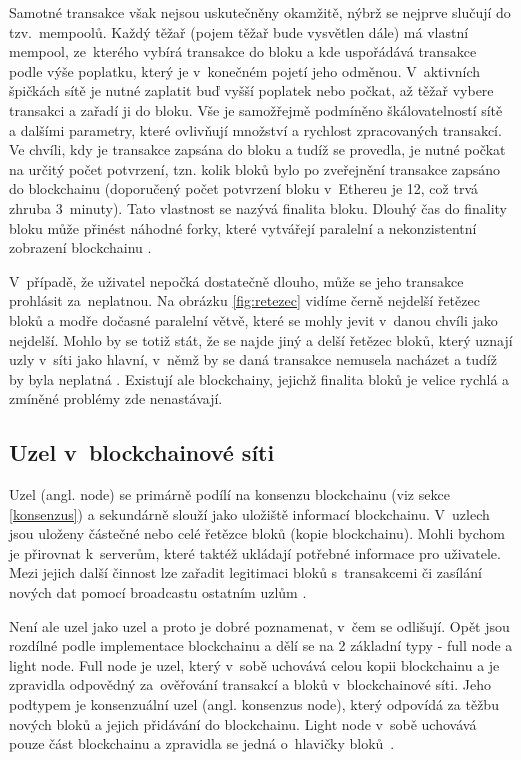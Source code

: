Samotné transakce však nejsou uskutečněny okamžitě, nýbrž se nejprve slučují do tzv.~mempoolů. Každý těžař (pojem těžař bude vysvětlen dále) má vlastní mempool, ze~kterého vybírá transakce do bloku a kde uspořádává transakce podle výše poplatku, který je v~konečném pojetí jeho odměnou. V~aktivních špičkách sítě je nutné zaplatit buď vyšší poplatek nebo počkat, až těžař vybere transakci a zařadí ji do bloku. Vše je samožřejmě podmíněno škálovatelností sítě a dalšími parametry, které ovlivňují množství a rychlost zpracovaných transakcí. Ve chvíli, kdy je transakce zapsána do bloku a tudíž se provedla, je nutné počkat na určitý počet potvrzení, tzn. kolik bloků bylo po zveřejnění transakce zapsáno do blockchainu (doporučený počet potvrzení bloku v~Ethereu je 12, což trvá zhruba 3~minuty). Tato vlastnost se nazývá finalita bloku. Dlouhý čas do finality bloku může přinést náhodné forky, které vytvářejí paralelní a nekonzistentní zobrazení blockchainu \cite{transaction}. 

V~případě, že uživatel nepočká dostatečně dlouho, může se jeho transakce prohlásit za~neplatnou. Na obrázku \ref{fig:retezec} vidíme černě nejdelší řetězec bloků a modře dočasné paralelní větvě, které se mohly jevit v~danou chvíli jako nejdelší. Mohlo by se totiž stát, že se najde jiný a delší řetězec bloků, který uznají uzly v~síti jako hlavní, v~němž by se daná transakce nemusela nacházet a tudíž by byla neplatná \cite{Transaction_confirmations}. Existují ale blockchainy, jejichž finalita bloků je velice rychlá a zmíněné problémy zde nenastávají.  

\subsection{Uzel v~blockchainové síti}
Uzel (angl. node) se primárně podílí na konsenzu blockchainu (viz sekce \ref{konsenzus}) a sekundárně slouží jako uložiště informací blockchainu. V~uzlech jsou uloženy částečné nebo celé řetězce bloků (kopie blockchainu). Mohli bychom je přirovnat k~serverům, které taktéž ukládají potřebné informace pro uživatele. Mezi jejich další činnost lze zařadit legitimaci bloků s~transakcemi či zasílání nových dat pomocí broadcastu ostatním uzlům \cite{Abrol2022}. 

Není ale uzel jako uzel a proto je dobré poznamenat, v~čem se odlišují. Opět jsou rozdílné podle implementace blockchainu a dělí se na 2 základní typy - full node a light node. Full node je uzel, který v~sobě uchovává celou kopii blockchainu a je zpravidla odpovědný za~ověřování transakcí a bloků v~blockchainové síti. Jeho podtypem je konsenzuální uzel (angl. konsenzus node), který odpovídá za těžbu nových bloků a jejich přidávání do blockchainu. Light node v~sobě uchovává pouze část blockchainu a zpravidla se jedná o~hlavičky bloků~\cite{Node2018}.

